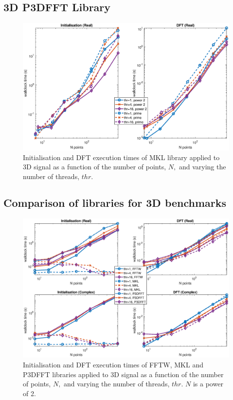 \documentclass[a4paper]{article}
\begin{document}
\subsection{3D P3DFFT Library}\label{Sec:3DP3DFFT}




\begin{figure}[htb]
    \centering
    \includegraphics[width=\linewidth]{../results/p3dfft_3d_thr.eps}
  \caption{Initialisation and DFT execution times of MKL library applied to 3D signal as a function of the
    number of points, $N,$ and varying the number of threads, $thr.$ }
  \label{3DP3DFFT}
\end{figure}


\subsection{Comparison of libraries for 3D benchmarks}\label{Sec:3DComp}




\begin{figure}[htb]
    \centering
    \includegraphics[width=\linewidth]{../results/fftw_mkl_p3dfft_2_3d_thr.eps}
  \caption{Initialisation and DFT execution times of FFTW, MKL and P3DFFT libraries applied to 3D signal as a function of the
    number of points, $N,$ and varying the number of threads, $thr.$ $N$ is a power of 2.}
  \label{3DFFTWMKL2}
\end{figure}
\end{document}
